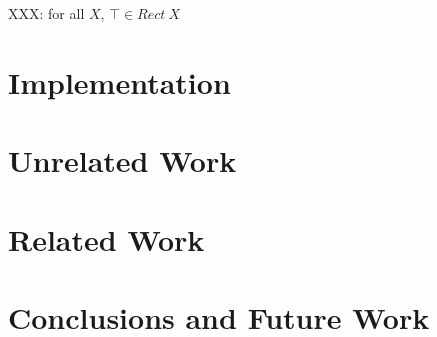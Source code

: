 \documentclass[preprint]{sigplanconf}
\begin{document}
XXX: for all $X$, $\top \in Rect~X$


\section{Implementation}

\section{Unrelated Work}

\section{Related Work}

\section{Conclusions and Future Work}






\end{document}
